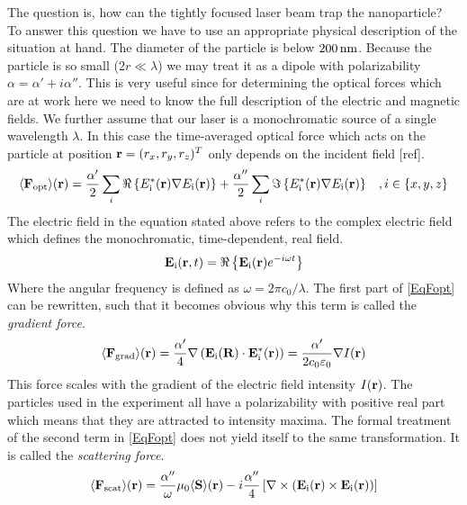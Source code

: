 The question is, how can the tightly focused laser beam trap the nanoparticle? To answer this question we have to use an appropriate physical description of the situation at hand. The diameter of the particle is below $200\nm$. Because the particle is so small ($2r\ll \lambda$) we may treat it as a dipole with polarizability $\alpha=\alpha'+i\alpha''$. This is very useful since for determining the optical forces which are at work here we need to know the full description of the electric and magnetic fields. We further assume that our laser is a monochromatic source of a single wavelength $\lambda$. In this case the time-averaged optical force which acts on the particle at position $\vc{r}=(r_x, r_y, r_z)^T$ only depends on the incident field [ref]. 
\begin{equation}
	\av{\field{F}{opt}}(\vc{r})=\frac{\alpha'}{2}\sum\limits_{i}\Re\left\{\de{E}{i}^*(\vc{r})\nabla\de{E}{i}(\vc{r})\right\}+\frac{\alpha''}{2}\sum\limits_{i}\Im\left\{\de{E}{i}^*(\vc{r})\nabla\de{E}{i}(\vc{r})\right\}\;\;\;, i\in\{x,y,z\}
\end{equation}
The electric field in the equation stated above refers to the complex electric field which defines the monochromatic, time-dependent, real field.
\begin{equation}\label{EqFopt}
	\field{E}{i}(\vc{r},t)=\Re\left\{\field{E}{i}(\vc{r})e^{-i\omega t}\right\}
\end{equation}
Where the angular frequency is defined as $\omega=2\pi c_0/\lambda$. The first part of \autoref{EqFopt} can be rewritten, such that it becomes obvious why this term is called the \textit{gradient force}.
\begin{equation}
	\av{\field{F}{grad}}(\vc{r})=\frac{\alpha'}{4}\nabla\left(\field{E}{i}(\vc{R})\cdot\field{E}{i}^*(\vc{r})\right)=\frac{\alpha'}{2c_0\varepsilon_0}\nabla I(\vc{r})
\end{equation} 
This force scales with the gradient of the electric field intensity $I(\vc{r})$. The particles used in the experiment all have a polarizability with positive real part which means that they are attracted to intensity maxima. The formal treatment of the second term in \autoref{EqFopt} does not yield itself to the same transformation. It is called the \textit{scattering force}.
\begin{equation}\label{EqScatteringForce}
	\av{\field{F}{scat}}(\vc{r})=\frac{\alpha''}\omega\mu_0\av{\vc{S}}(\vc{r})-i\frac{\alpha''}{4}\left[\nabla\times\left(\field{E}{i}(\vc{r})\times\field{E}{i}(\vc{r})\right)\right]
\end{equation}
